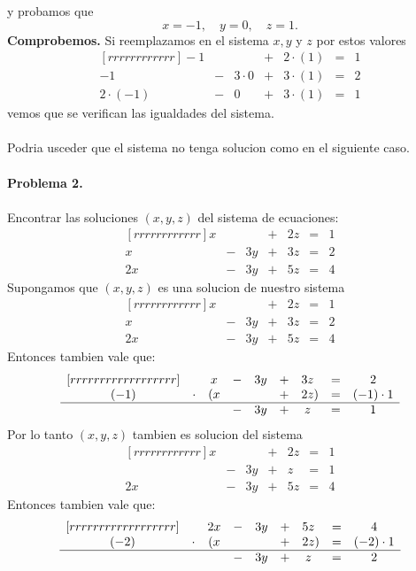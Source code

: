 \documentclass{article}
\theoremstyle{definition}
\theoremstyle{definition}
\theoremstyle{remark}
\begin{document}
y probamos que \[
x=-1, \quad y=0, \quad z=1.
\]
\textbf{Comprobemos.} Si reemplazamos en el sistema $x,y$ y $z$ por estos valores 
\[
 \begin{matrix}[rrrrrrrrrrrr]
    -1 & & & + & 2\cdot(1) & = & 1 \\
    -1  & - & 3\cdot0 & + & 3\cdot(1) & = & 2 \\
    2\cdot(-1) & - & 0 & + & 3\cdot(1) & = & 1
  \end{matrix}
\]
vemos que se verifican las igualdades del sistema.
\\\\
Podria usceder que el sistema no tenga solucion como en el siguiente caso.\\\\
\textbf{Problema 2.}\\\\
Encontrar las soluciones $(x,y,z)$ del sistema de ecuaciones:
\[
 \begin{matrix}[rrrrrrrrrrrr]
     x &  & & + & 2z& = & 1  \\
     x & - & 3y & + & 3z & = & 2 \\
     2x & - & 3y & + & 5z & = &  4 
  \end{matrix}
\]
Supongamos que $(x,y,z)$ es una solucion de nuestro sistema \[
 \begin{matrix}[rrrrrrrrrrrr]
     x &  & & + & 2z& = & 1  \\
     x & - & 3y & + & 3z & = & 2 \\
     2x & - & 3y & + & 5z & = &  4 
  \end{matrix}
\]
Entonces tambien vale que: \[
 \begin{matrix}[rrrrrrrrrrrrrrrrrr]
&& x & - & 3y & + & 3z\phantom{)} & = & 2 \\
    (-1) & \cdot & (x& & & + & 2z ) & = & (-1) \cdot 1 \\
    \hline 
         & &  & - & 3y & + & z \phantom{)} & = & 1
  \end{matrix}
\]
Por lo tanto $(x,y,z)$ tambien es solucion del sistema \[
 \begin{matrix}[rrrrrrrrrrrr]
     x &  & & + & 2z& = & 1  \\
      & - & 3y & + & z & = & 1 \\
     2x & - & 3y & + & 5z & = &  4 
  \end{matrix}
\]
Entonces tambien vale que: \[
 \begin{matrix}[rrrrrrrrrrrrrrrrrr]
&& 2x & - & 3y & + & 5z\phantom{)} & = & 4 \\
    (-2) & \cdot & (x& & & + & 2z ) & = & (-2) \cdot 1 \\
    \hline 
         & &  & - & 3y & + & z \phantom{)} & = & 2
  \end{matrix}
\]
\end{document}
